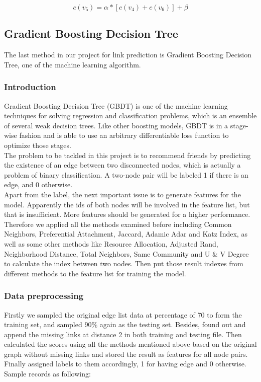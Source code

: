 \documentclass{article}
\begin{document}
\begin{equation}
c(v_5) = \alpha * [c(v_4)+c(v_6)] + \beta
\end{equation}


\subsection{Gradient Boosting Decision Tree}
The last method in our project for link prediction is Gradient Boosting Decision Tree, one of the machine learning algorithm.
\subsubsection{Introduction}
Gradient Boosting Decision Tree (GBDT) is one of the  machine learning techniques for solving regression and classification problems, which is an ensemble of several weak decision trees. Like other boosting models, GBDT is in a stage-wise fashion and is able to use an arbitrary differentiable loss function to optimize those stages. \\

The problem to be tackled in this project is to recommend friends by predicting the existence of an edge between two disconnected nodes, which is actually a problem of binary classification. A two-node pair will be labeled 1 if there is an edge, and 0 otherwise. \\

Apart from the label, the next important issue is to generate features for the model. Apparently the ids of both nodes will be involved in the feature list, but that is insufficient. More features should be generated for a higher performance. Therefore we applied all the methods examined before including Common Neighbors, Preferential Attachment, Jaccard, Adamic Adar and Katz Index, as well as some other methods like Resource Allocation, Adjusted Rand, Neighborhood Distance, Total Neighbors, Same Community and U \& V Degree to calculate the index between two nodes. Then put those result indexes from different methods to the feature list for training the model. \\

\subsubsection{Data preprocessing}
Firstly we sampled the original edge list data at percentage of 70 to form the training set, and sampled 90\% again as the testing set. Besides, found out and append the missing links at distance 2 in both training and testing file. Then calculated the scores using all the methods mentioned above based on the original graph without missing links and stored the result as features for all node pairs. Finally assigned labels to them accordingly, 1 for having edge and 0 otherwise. Sample records as following:
\end{document}
